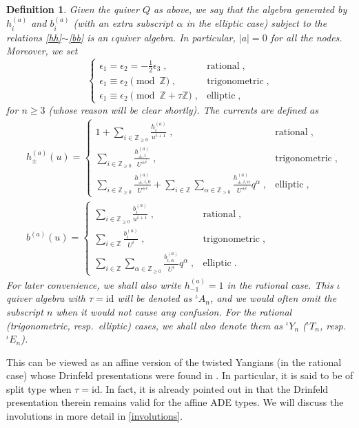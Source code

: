 \documentclass[11pt]{article}
\numberwithin{equation}{section}
\numberwithin{figure}{section}
\numberwithin{table}{section}
\newtheorem{definition}{Definition}[section]
\begin{document}
\begin{definition}
	Given the quiver $Q$ as above, we say that the algebra generated by $h^{(a)}_i$ and $b^{(a)}_i$ (with an extra subscript $\alpha$ in the elliptic case) subject to the relations \eqref{hh}$\sim$\eqref{bb} is an $\iota$quiver algebra. In particular, $|a|=0$ for all the nodes. Moreover, we set
	\begin{equation}
		\begin{cases}
			\epsilon_1=\epsilon_2=-\frac{1}{2}\epsilon_3\;,&\text{rational}\;,\\
			\epsilon_1\equiv\epsilon_2\pmod{\mathbb{Z}}\;,&\text{trigonometric}\;,\\
			\epsilon_1\equiv\epsilon_2\pmod{\mathbb{Z}+\tau\mathbb{Z}}\;,&\text{elliptic}\;,
		\end{cases}
	\end{equation}
	for $n\geq3$ (whose reason will be clear shortly). The currents are defined as
	\begin{subequations}
		\begin{align}
		&h^{(a)}_\pm(u)=\begin{cases}
		1+\sum\limits_{i\in\mathbb{Z}_{\geq0}}\frac{h^{(a)}_i}{u^{i+1}}\;,&\text{rational}\;,\\
		\sum\limits_{i\in\mathbb{Z}_{\geq0}}\frac{h^{(a)}_{\pm,i}}{U^{\pm i}}\;,&\text{trigonometric}\;,\\
		\sum\limits_{i\in\mathbb{Z}_{\geq0}}\frac{h^{(a)}_{\pm,i,0}}{U^{\pm i}}+\sum\limits_{i\in\mathbb{Z}}\sum\limits_{\alpha\in\mathbb{Z}_{>0}}\frac{h^{(a)}_{\pm,i,\alpha}}{U^{\pm i}}q^\alpha\;,&\text{elliptic}\;,
		\end{cases}\\
		&b^{(a)}(u)=\begin{cases}
		\sum\limits_{i\in\mathbb{Z}_{\geq0}}\frac{b^{(a)}_i}{u^{i+1}}\;,&\text{rational}\;,\\
		\sum\limits_{i\in\mathbb{Z}}\frac{b^{(a)}_i}{U^i}\;,&\text{trigonometric}\;,\\
		\sum\limits_{i\in\mathbb{Z}}\sum\limits_{\alpha\in\mathbb{Z}_{\geq0}}\frac{b^{(a)}_{i,\alpha}}{U^i}q^\alpha\;,&\text{elliptic}\;.
		\end{cases}
		\end{align}
	\end{subequations}
	For later convenience, we shall also write $h^{(a)}_{-1}=1$ in the rational case. This $\iota$quiver algebra with $\tau=\mathrm{id}$ will be denoted as ${}^\iota A_n$, and we would often omit the subscript $n$ when it would not cause any confusion. For the rational (trigonometric, resp.~elliptic) cases, we shall also denote them as ${}^\iota Y_n$ (${}^\iota T_n$, resp.~${}^\iota E_n$).
\end{definition}
This can be viewed as an affine version of the twisted Yangians (in the rational case) whose Drinfeld presentations were found in \cite{Lu_2025,2024arXiv240806981L,lu2026twisted}. In particular, it is said to be of split type when $\tau=\mathrm{id}$. In fact, it is already pointed out in \cite{Lu_2025} that the Drinfeld presentation therein remains valid for the affine ADE types. We will discuss the involutions in more detail in \cref{involutions}.
\end{document}
